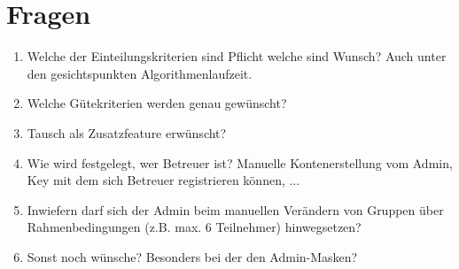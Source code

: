 \documentclass[parskip=full]{scrartcl}
\begin{document}
\section{Fragen}
\begin{enumerate}
  \item Welche der Einteilungskriterien sind Pflicht welche sind Wunsch? Auch
  unter den gesichtspunkten Algorithmenlaufzeit.

  \item Welche Gütekriterien werden genau gewünscht?
  \item Tausch als Zusatzfeature erwünscht?
  \item Wie wird festgelegt, wer Betreuer ist? Manuelle Kontenerstellung vom Admin, Key mit dem sich Betreuer registrieren können, ...
  \item Inwiefern darf sich der Admin beim manuellen Verändern von Gruppen über Rahmenbedingungen (z.B. max. 6 Teilnehmer) hinwegsetzen?

  
  
  
  \item Sonst noch wünsche? Besonders bei der den Admin-Masken?
\end{enumerate}
\end{document}
